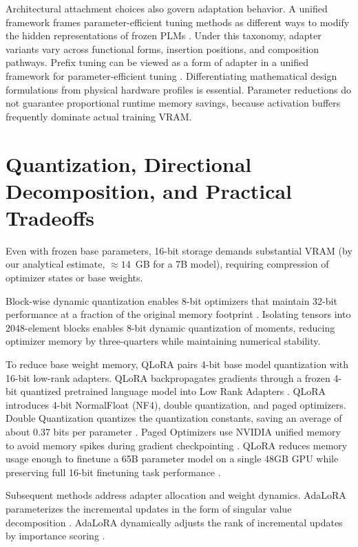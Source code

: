 \documentclass[11pt,a4paper]{article}
\begin{document}
Architectural attachment choices also govern adaptation behavior. A unified framework frames parameter-efficient tuning methods as different ways to modify the hidden representations of frozen PLMs \cite{he2021unified}. Under this taxonomy, adapter variants vary across functional forms, insertion positions, and composition pathways. Prefix tuning can be viewed as a form of adapter in a unified framework for parameter-efficient tuning \cite{he2021unified}. Differentiating mathematical design formulations from physical hardware profiles is essential. Parameter reductions do not guarantee proportional runtime memory savings, because activation buffers frequently dominate actual training VRAM.

\section{Quantization, Directional Decomposition, and Practical Tradeoffs}

Even with frozen base parameters, 16-bit storage demands substantial VRAM (by our analytical estimate, $\approx 14$~GB for a 7B model), requiring compression of optimizer states or base weights.

Block-wise dynamic quantization enables 8-bit optimizers that maintain 32-bit performance at a fraction of the original memory footprint \cite{dettmers20218}. Isolating tensors into 2048-element blocks enables 8-bit dynamic quantization of moments, reducing optimizer memory by three-quarters while maintaining numerical stability.

To reduce base weight memory, QLoRA pairs 4-bit base model quantization with 16-bit low-rank adapters. QLoRA backpropagates gradients through a frozen 4-bit quantized pretrained language model into Low Rank Adapters \cite{dettmers2023qlora}. QLoRA introduces 4-bit NormalFloat (NF4), double quantization, and paged optimizers. Double Quantization quantizes the quantization constants, saving an average of about 0.37 bits per parameter \cite{dettmers2023qlora}. Paged Optimizers use NVIDIA unified memory to avoid memory spikes during gradient checkpointing \cite{dettmers2023qlora}. QLoRA reduces memory usage enough to finetune a 65B parameter model on a single 48GB GPU while preserving full 16-bit finetuning task performance \cite{dettmers2023qlora}.

Subsequent methods address adapter allocation and weight dynamics. AdaLoRA parameterizes the incremental updates in the form of singular value decomposition \cite{zhang2023adalora}. AdaLoRA dynamically adjusts the rank of incremental updates by importance scoring \cite{zhang2023adalora}.
\end{document}
